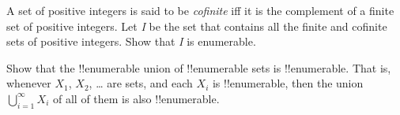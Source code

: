 \documentclass[../../include/open-logic-section]{subfiles}
\begin{document}
\begin{prob}
A set of positive integers is said to be \emph{cofinite} iff
it is the complement of a finite set of positive integers. Let
\emph{I} be the set that contains all the finite and cofinite sets of
positive integers. Show that \emph{I} is enumerable.
\end{prob}

\begin{prob}
Show that the !!{enumerable} union of !!{enumerable} sets is
!!{enumerable}. That is, whenever $X_1$, $X_2$, \dots{} are sets, and
each $X_i$ is !!{enumerable}, then the union $\bigcup_{i=1}^\infty
X_i$ of all of them is also !!{enumerable}.
\end{prob}
\end{document}
